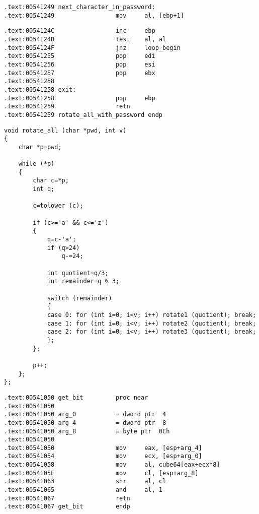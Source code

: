 \begin{lstlisting}
.text:00541249 next_character_in_password:
.text:00541249                 mov     al, [ebp+1]
\end{lstlisting}


\begin{lstlisting}
.text:0054124C                 inc     ebp
.text:0054124D                 test    al, al
.text:0054124F                 jnz     loop_begin
.text:00541255                 pop     edi
.text:00541256                 pop     esi
.text:00541257                 pop     ebx
.text:00541258
.text:00541258 exit:
.text:00541258                 pop     ebp
.text:00541259                 retn
.text:00541259 rotate_all_with_password endp
\end{lstlisting}


\begin{lstlisting}
void rotate_all (char *pwd, int v)
{
	char *p=pwd;

	while (*p)
	{
		char c=*p;
		int q;

		c=tolower (c);

		if (c>='a' && c<='z')
		{
			q=c-'a';
			if (q>24)
				q-=24;

			int quotient=q/3;
			int remainder=q % 3;

			switch (remainder)
			{
			case 0: for (int i=0; i<v; i++) rotate1 (quotient); break;
			case 1: for (int i=0; i<v; i++) rotate2 (quotient); break;
			case 2: for (int i=0; i<v; i++) rotate3 (quotient); break;
			};
		};

		p++;
	};
};
\end{lstlisting}



\begin{lstlisting}
.text:00541050 get_bit         proc near
.text:00541050
.text:00541050 arg_0           = dword ptr  4
.text:00541050 arg_4           = dword ptr  8
.text:00541050 arg_8           = byte ptr  0Ch
.text:00541050
.text:00541050                 mov     eax, [esp+arg_4]
.text:00541054                 mov     ecx, [esp+arg_0]
.text:00541058                 mov     al, cube64[eax+ecx*8]
.text:0054105F                 mov     cl, [esp+arg_8]
.text:00541063                 shr     al, cl
.text:00541065                 and     al, 1
.text:00541067                 retn
.text:00541067 get_bit         endp
\end{lstlisting}

